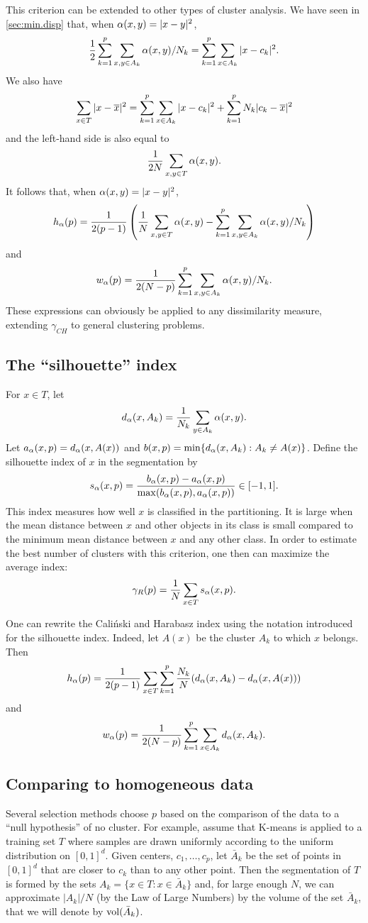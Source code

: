 This criterion can be extended to other types of cluster analysis. We have seen in \cref{sec:min.disp} that, when $\alpha(x,y) = |x-y|^2$,
\[
\frac12 \sum_{k=1}^p \sum_{x,y\in A_k} \alpha(x,y)/N_k = \sum_{k=1}^p \sum_{x\in A_k} |x - c_k|^2.
\]
We also have
\[
\sum_{x\in T} |x-\overline{x}|^2 = \sum_{k=1}^p \sum_{x\in A_k} |x - c_k|^2 + \sum_{k=1}^p N_k |c_k - \overline{x}|^2
\]
and the left-hand side is also equal to 
\[
\frac1{2N} \sum_{x,y\in T} \alpha(x,y).
\]
It follows that, when  $\alpha(x,y) = |x-y|^2$,
\[
h_\alpha(p) =  \frac1{2(p-1)} \left(\frac1N \sum_{x,y\in T} \alpha(x,y) - \sum_{k=1}^p \sum_{x,y\in A_k} \alpha(x,y)/N_k\right)
\]
and 
\[
w_\alpha(p) = \frac1{2(N-p)} \sum_{k=1}^p \sum_{x,y\in A_k} \alpha(x,y)/N_k.
\]
These expressions can obviously be applied to any dissimilarity measure, extending $\gamma_{CH}$ to general clustering problems. 

\subsection{The ``silhouette'' index}
For $x\in T$, let 
\[
d_\alpha(x, A_k) = \frac1{N_k} \sum_{y\in A_k} \alpha(x,y).
\]
Let $a_\alpha(x, p) = d_\alpha(x, A(x))$ and $b(x, p) = \min\{d_\alpha(x, A_k): A_k\neq A(x)\}$. Define the  silhouette index of $x$ in the segmentation \citep{rousseeuw1987silhouettes}by
\[
s_\alpha(x, p) = \frac{b_\alpha(x,p) - a_\alpha(x,p)}{\max(b_\alpha(x,p), a_\alpha(x,p))} \in [-1,1].
\]
This index measures how well $x$ is classified in the partitioning. It is large when the mean distance between $x$ and other objects in its class is small compared to the minimum mean distance between $x$ and any other class. In order to estimate the best number of clusters with this criterion, one then can maximize the average index:
\[
\gamma_{R}(p) = \frac1N \sum_{x\in T} s_\alpha(x,p).
\]
 
\begin{remark}
One can rewrite the Cali\'nski and Harabasz index using the notation introduced for the silhouette index.
Indeed, let $A(x)$ be the cluster $A_k$ to which $x$ belongs. Then 
\[
h_{\alpha}(p) =\frac1{2(p-1)} \sum_{x\in T} \sum_{k=1}^p \frac{N_k}{N} (d_\alpha(x, A_k) - d_\alpha(x, A(x)))
\] 
and
\[
w_\alpha(p) = \frac1{2(N-p)} \sum_{k=1}^p \sum_{x\in A_k} d_\alpha(x, A_k).
\]
\end{remark}
 
\subsection{Comparing to homogeneous data} 
Several selection methods choose $p$ based on the comparison of the data to a ``null hypothesis'' of no cluster. 
For example, assume that K-means is applied to a training set $T$ where samples are drawn uniformly according to the uniform distribution on $[0,1]^d$. Given  centers, $c_1, \ldots, c_p$, let $\bar A_k$ be the set of points in $[0,1]^d$ that are closer to $c_k$ than to any other point. Then the segmentation of $T$ is formed by the sets $A_k = \{x\in T: x\in \bar A_k\}$ and, for large enough $N$, we can approximate $|A_k|/N$ (by the Law of Large Numbers) by the volume of the set $\bar A_k$, that we will denote by $\text{vol}(\bar A_k)$.


